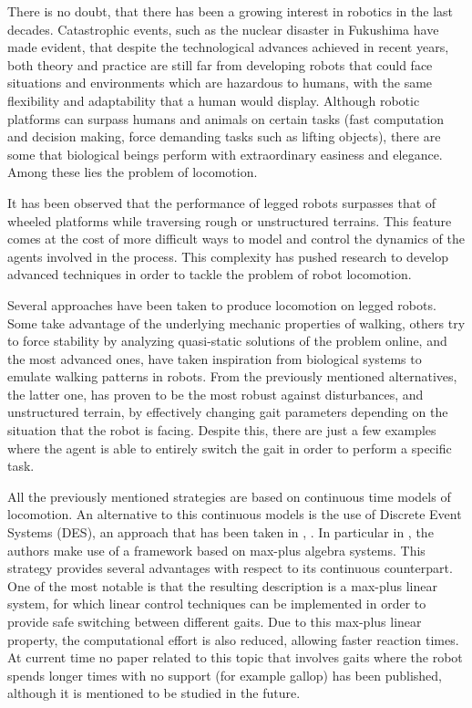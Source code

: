 \documentclass[../main.tex]{subfiles}
\begin{document}
There is no doubt, that there has been a growing interest in robotics in the last decades. Catastrophic events, such as the nuclear disaster in Fukushima have made evident,  that despite the technological advances achieved in recent years, both theory and practice are still far from developing robots that could face situations and environments which are hazardous to humans, with the same flexibility and adaptability that a human would display. Although robotic platforms can surpass humans and animals on certain tasks (fast computation and decision making, force demanding tasks such as lifting objects), there are some that biological beings perform with extraordinary easiness and elegance. Among these lies the problem of locomotion.

It has been observed that the performance of legged robots surpasses that of wheeled platforms while traversing rough or unstructured terrains. This feature comes at the cost of more difficult ways to model and control the dynamics of the agents involved in the process. This complexity has pushed research to develop advanced techniques in order to tackle the problem of robot locomotion. 

Several approaches have been taken to produce locomotion on legged robots. Some take advantage of the underlying mechanic properties of walking, others try to force stability by analyzing quasi-static solutions of the problem online, and the most advanced ones, have taken inspiration from biological systems to emulate walking patterns in robots. From the previously mentioned alternatives, the latter one, has proven to be the most robust against disturbances, and unstructured terrain, by effectively changing gait parameters depending on the situation that the robot is facing. Despite this, there are just a few examples where the agent is able to entirely switch the gait in order to perform a specific task.

All the previously mentioned strategies are based on continuous time models of locomotion. An alternative to this continuous models is the use of Discrete Event Systems (DES), an approach that has been taken in \cite{Lopes2010}, \cite{Barai}. In particular in \cite{Lopes2010}, the authors make use of a framework based on max-plus algebra systems. This strategy provides several advantages with respect to its continuous counterpart. One of the most notable is that the resulting description is a max-plus linear system, for which linear control techniques can be implemented in order to provide safe switching between different gaits. Due to this max-plus linear property, the computational effort is also reduced, allowing faster reaction times. At current time no paper related to this topic that involves gaits where the robot spends longer times with no support (for example gallop) has been published, although it is mentioned to be studied in the future.
\end{document}
